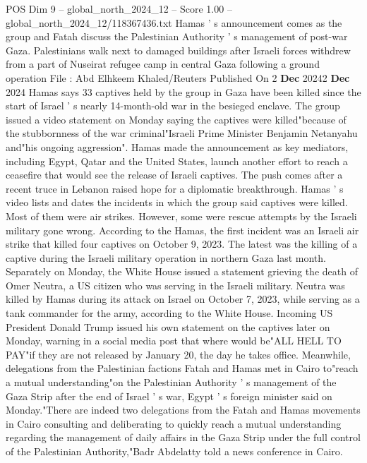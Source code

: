 \begin{textsample}{POS Dim 9 – global\_north\_2024\_12 – Score 1.00 – global\_north\_2024\_12/118367436.txt}  \label{ex:f9_pos_338}
Hamas ' s announcement comes as the group and Fatah discuss the Palestinian Authority ' s management of post-war Gaza.
Palestinians walk next to damaged buildings after Israeli forces withdrew from a part of Nuseirat refugee camp in central Gaza following a ground operation File : Abd Elhkeem Khaled/Reuters Published On 2 \textbf{Dec} 20242 \textbf{Dec} 2024 Hamas says 33 captives held by the group in Gaza have been killed since the start of Israel ' s nearly 14-month-old war in the besieged enclave.
The group issued a video statement on Monday saying the captives were killed"because of the stubbornness of the war criminal"Israeli Prime Minister Benjamin Netanyahu and"his ongoing aggression".
Hamas made the announcement as key mediators, including Egypt, Qatar and the United States, launch another effort to reach a ceasefire that would see the release of Israeli captives.
The push comes after a recent truce in Lebanon raised hope for a diplomatic breakthrough.
Hamas ' s video lists and dates the incidents in which the group said captives were killed.
Most of them were air strikes.
However, some were rescue attempts by the Israeli military gone wrong.
According to the Hamas, the first incident was an Israeli air strike that killed four captives on October 9, 2023.
The latest was the killing of a captive during the Israeli military operation in northern Gaza last month.
Separately on Monday, the White House issued a statement grieving the death of Omer Neutra, a US citizen who was serving in the Israeli military.
Neutra was killed by Hamas during its attack on Israel on October 7, 2023, while serving as a tank commander for the army, according to the White House.
Incoming US President Donald Trump issued his own statement on the captives later on Monday, warning in a social media post that where would be"ALL HELL TO PAY"if they are not released by January 20, the day he takes office.
Meanwhile, delegations from the Palestinian factions Fatah and Hamas met in Cairo to"reach a mutual understanding"on the Palestinian Authority ' s management of the Gaza Strip after the end of Israel ' s war, Egypt ' s foreign minister said on Monday."There are indeed two delegations from the Fatah and Hamas movements in Cairo consulting and deliberating to quickly reach a mutual understanding regarding the management of daily affairs in the Gaza Strip under the full control of the Palestinian Authority,"Badr Abdelatty told a news conference in Cairo.

\end{textsample}

